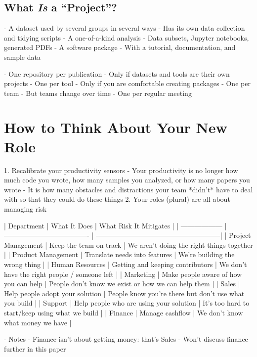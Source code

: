 \documentclass[10pt,letterpaper]{article}
\begin{document}
\subsection*{What \emph{Is} a ``Project''?}

- A dataset used by several groups in several ways
  - Has its own data collection and tidying scripts
- A one-of-a-kind analysis
  - Data subsets, Jupyter notebooks, generated PDFs
- A software package
  - With a tutorial, documentation, and sample data

- One repository per publication
  - Only if datasets and tools are their own projects
- One per tool
  - Only if you are comfortable creating packages
- One per team
  - But teams change over time
- One per regular meeting

\section{How to Think About Your New Role}

1. Recalibrate your productivity sensors
   - Your productivity is no longer how much code you wrote, how many samples you analyzed, or how many papers you wrote
   - It is how many obstacles and distractions your team *didn't* have to deal with so that they could do these things
2. Your roles (plural) are all about managing risk

| Department         | What It Does                            | What Risk It Mitigates                                |
| ------------------ | -------------------------------------   | ------------------------------------------------------|
| Project Management | Keep the team on track                  | We aren't doing the right things together             |
| Product Management | Translate needs into features           | We're building the wrong thing                        |
| Human Resources    | Getting and keeping contributors        | We don't have the right people / someone left         |
| Marketing          | Make people aware of how you can help   | People don't know we exist or how we can help them    |
| Sales              | Help people adopt your solution         | People know you're there but don't use what you build |
| Support            | Help people who are using your solution | It's too hard to start/keep using what we build       |
| Finance            | Manage cashflow                         | We don't know what money we have                      |

- Notes
  - Finance isn't about getting money: that's Sales
  - Won't discuss finance further in this paper
\end{document}
